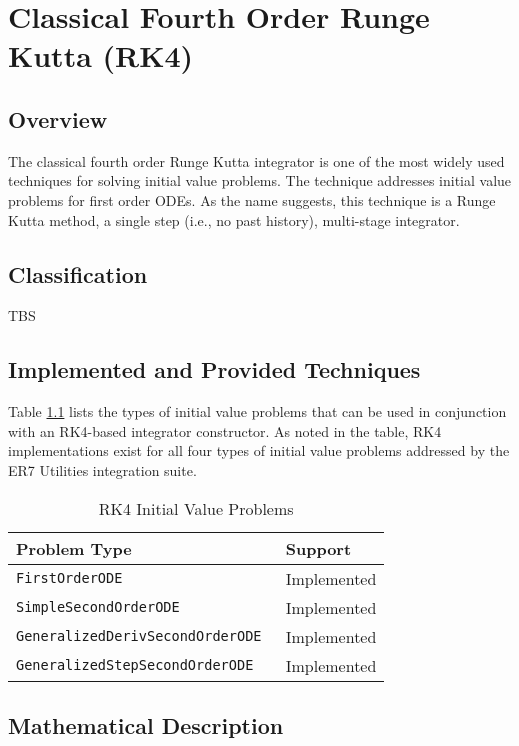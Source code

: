 \chapter{Classical Fourth Order Runge Kutta (RK4)}\label{app:rk4}

\section{Overview}

The classical fourth order Runge Kutta integrator is one of the most widely
used techniques for solving initial value problems.
The technique addresses initial value problems for first order ODEs.
As the name suggests, this technique is a Runge Kutta method,
a single step (i.e., no past history), multi-stage integrator.

\section{Classification}

TBS

\section{Implemented and Provided Techniques}

Table \ref{tab:rk4_method_problems} lists the types of initial value problems
that can be used in conjunction with an RK4-based integrator
constructor. As noted in the table, RK4 implementations exist
for all four types of initial value problems addressed by the
ER7 Utilities integration suite.

\begin{table}[htp]
\centering
\caption{RK4 Initial Value Problems}
\label{tab:rk4_method_problems}
\vspace{1ex}
\begin{tabular}{ll}\hline
\bf{Problem Type} & \bf{Support} \\
\hline\hline
\tt{FirstOrderODE} & Implemented \\
\tt{SimpleSecondOrderODE} & Implemented \\
\tt{GeneralizedDerivSecondOrderODE} & Implemented \\
\tt{GeneralizedStepSecondOrderODE} & Implemented \\
\hline
\end{tabular}
\end{table}

\section{Mathematical Description}

